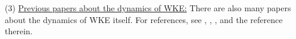 (3) \underline{Previous papers about the dynamics of WKE:} There are also many papers about the dynamics of WKE itself. For references, see \cite{GI}, \cite{GST}, \cite{SoT1}, \cite{SoT2} and the reference therein.




